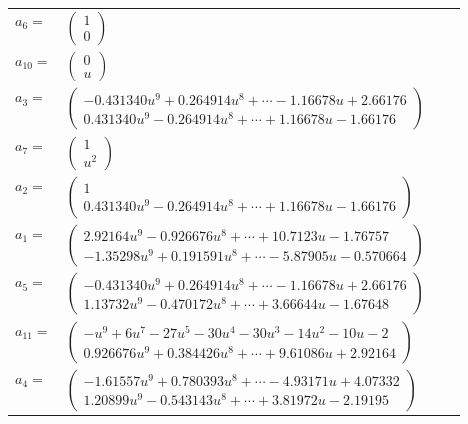 \documentclass[1p]{elsarticle_modified}
\theoremstyle{definition}
\begin{document}
\begin{tabular}{m{7pt} m{180pt} m{7pt} m{180pt} }
\flushright $a_{6}=$&$\begin{pmatrix}1\\0\end{pmatrix}$ \\
\flushright $a_{10}=$&$\begin{pmatrix}0\\u\end{pmatrix}$ \\
\flushright $a_{3}=$&$\begin{pmatrix}-0.431340 u^{9}+0.264914 u^{8}+\cdots-1.16678 u+2.66176\\0.431340 u^{9}-0.264914 u^{8}+\cdots+1.16678 u-1.66176\end{pmatrix}$ \\
\flushright $a_{7}=$&$\begin{pmatrix}1\\u^2\end{pmatrix}$ \\
\flushright $a_{2}=$&$\begin{pmatrix}1\\0.431340 u^{9}-0.264914 u^{8}+\cdots+1.16678 u-1.66176\end{pmatrix}$ \\
\flushright $a_{1}=$&$\begin{pmatrix}2.92164 u^{9}-0.926676 u^{8}+\cdots+10.7123 u-1.76757\\-1.35298 u^{9}+0.191591 u^{8}+\cdots-5.87905 u-0.570664\end{pmatrix}$ \\
\flushright $a_{5}=$&$\begin{pmatrix}-0.431340 u^{9}+0.264914 u^{8}+\cdots-1.16678 u+2.66176\\1.13732 u^{9}-0.470172 u^{8}+\cdots+3.66644 u-1.67648\end{pmatrix}$ \\
\flushright $a_{11}=$&$\begin{pmatrix}- u^9+6 u^7-27 u^5-30 u^4-30 u^3-14 u^2-10 u-2\\0.926676 u^{9}+0.384426 u^{8}+\cdots+9.61086 u+2.92164\end{pmatrix}$ \\
\flushright $a_{4}=$&$\begin{pmatrix}-1.61557 u^{9}+0.780393 u^{8}+\cdots-4.93171 u+4.07332\\1.20899 u^{9}-0.543143 u^{8}+\cdots+3.81972 u-2.19195\end{pmatrix}$ \\

\end{tabular}
\end{document}
